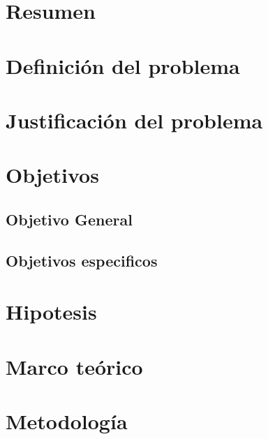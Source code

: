 \documentclass[letter,openright,12pt]{book}
\begin{document}
  \newpage
  \mbox{}
  \thispagestyle{empty} %
  
  
  \chapter*{Resumen} %
  
  \tableofcontents %

  \cleardoublepage
  \listoffigures %

  \cleardoublepage
  \listoftables %
  
  \chapter{Definición del problema}
  
  \chapter{Justificación del problema}
  
  \chapter{Objetivos}
  \section{Objetivo General}
  \section{Objetivos especificos}
  
  \chapter{Hipotesis}
  
  \chapter{Marco teórico}
  
  \chapter{Metodología}
  
\end{document}
